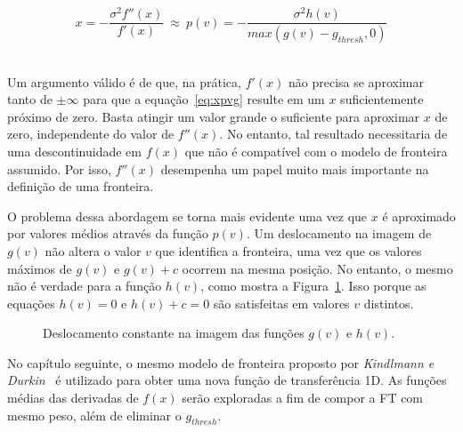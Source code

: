 \begin{equation} \label{eq:xpvg}
	x = -\frac{\sigma^{2}f''(x)}{f'(x)} \ \approx \ 
	p(v) = -\frac{\sigma^{2}h(v)}{max(g(v) - g_{thresh}, 0)}
\end{equation} \

	Um argumento válido é de que, na prática, $ f'(x) $ não precisa se aproximar tanto de $ \pm \infty $ para que a equação~\eqref{eq:xpvg} resulte em um $ x $ suficientemente próximo de zero. Basta atingir um valor grande o suficiente para aproximar $ x $ de zero, independente do valor de $ f''(x) $. No entanto, tal resultado necessitaria de uma descontinuidade em $ f(x) $ que não é compatível com o modelo de fronteira assumido. Por isso, $ f''(x) $ desempenha um papel muito mais importante na definição de uma fronteira.
	
	O problema dessa abordagem se torna mais evidente uma vez que $ x $ é aproximado por valores médios através da função $ p(v) $. Um deslocamento na imagem de $ g(v) $ não altera o valor $ v $ que identifica a fronteira, uma vez que os valores máximos de $ g(v) $ e $ g(v) + c $ ocorrem na mesma posição. No entanto, o mesmo não é verdade para a função $ h(v) $, como mostra a Figura~\ref{fig:g_shift}. Isso porque as equações $ h(v) = 0 $ e $ h(v) + c = 0 $ são satisfeitas em valores $ v $ distintos.
	
\begin{figure}[h]
	\centering
	\caption{Deslocamento constante na imagem das funções $ g(v) $ e $ h(v) $.}
	\label{fig:g_shift}
\end{figure}

	No capítulo seguinte, o mesmo modelo de fronteira proposto por \textit{Kindlmann e Durkin}~\cite{gordon} é utilizado para obter uma nova função de transferência 1D. As funções médias das derivadas de $ f(x) $ serão exploradas a fim de compor a FT com mesmo peso, além de eliminar o $ g_{thresh} $.